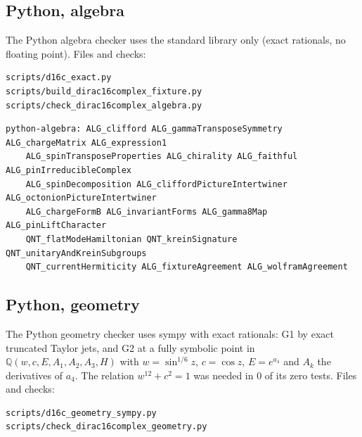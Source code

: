 \documentclass[11pt]{article}
\begin{document}
\subsection{Python, algebra}

The Python algebra checker uses the standard library only (exact rationals, no floating point). Files and checks:

\begin{Verbatim}[fontsize=\small]
scripts/d16c_exact.py
scripts/build_dirac16complex_fixture.py
scripts/check_dirac16complex_algebra.py
\end{Verbatim}

\begin{Verbatim}[fontsize=\small]
python-algebra: ALG_clifford ALG_gammaTransposeSymmetry ALG_chargeMatrix ALG_expression1
    ALG_spinTransposeProperties ALG_chirality ALG_faithful ALG_pinIrreducibleComplex
    ALG_spinDecomposition ALG_cliffordPictureIntertwiner ALG_octonionPictureIntertwiner
    ALG_chargeFormB ALG_invariantForms ALG_gamma8Map ALG_pinLiftCharacter
    QNT_flatModeHamiltonian QNT_kreinSignature QNT_unitaryAndKreinSubgroups
    QNT_currentHermiticity ALG_fixtureAgreement ALG_wolframAgreement
\end{Verbatim}

\subsection{Python, geometry}

The Python geometry checker uses sympy with exact rationals: G1 by exact truncated Taylor jets, and G2 at a fully symbolic point in $\mathbb Q(w,c,E,A_1,A_2,A_3,H)$ with $w=\sin^{1/6}z$, $c=\cos z$, $E=e^{a_4}$ and $A_k$ the derivatives of $a_4$. The relation $w^{12}+c^2=1$ was needed in 0 of its zero tests. Files and checks:

\begin{Verbatim}[fontsize=\small]
scripts/d16c_geometry_sympy.py
scripts/check_dirac16complex_geometry.py
\end{Verbatim}
\end{document}
